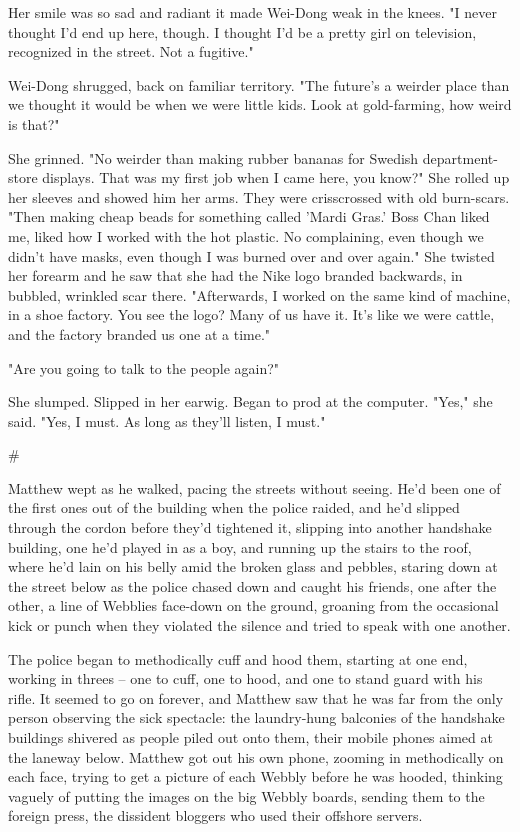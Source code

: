 Her smile was so sad and radiant it made Wei-Dong weak in the
knees. "I never thought I'd end up here, though. I thought I'd be a
pretty girl on television, recognized in the street. Not a
fugitive."

Wei-Dong shrugged, back on familiar territory. "The future's a
weirder place than we thought it would be when we were little kids.
Look at gold-farming, how weird is that?"

She grinned. "No weirder than making rubber bananas for Swedish
department-store displays. That was my first job when I came here,
you know?" She rolled up her sleeves and showed him her arms. They
were crisscrossed with old burn-scars. "Then making cheap beads for
something called 'Mardi Gras.' Boss Chan liked me, liked how I
worked with the hot plastic. No complaining, even though we didn't
have masks, even though I was burned over and over again." She
twisted her forearm and he saw that she had the Nike logo branded
backwards, in bubbled, wrinkled scar there. "Afterwards, I worked
on the same kind of machine, in a shoe factory. You see the logo?
Many of us have it. It's like we were cattle, and the factory
branded us one at a time."

"Are you going to talk to the people again?"

She slumped. Slipped in her earwig. Began to prod at the computer.
"Yes," she said. "Yes, I must. As long as they'll listen, I must."

\#

Matthew wept as he walked, pacing the streets without seeing. He'd
been one of the first ones out of the building when the police
raided, and he'd slipped through the cordon before they'd tightened
it, slipping into another handshake building, one he'd played in as
a boy, and running up the stairs to the roof, where he'd lain on
his belly amid the broken glass and pebbles, staring down at the
street below as the police chased down and caught his friends, one
after the other, a line of Webblies face-down on the ground,
groaning from the occasional kick or punch when they violated the
silence and tried to speak with one another.

The police began to methodically cuff and hood them, starting at
one end, working in threes -- one to cuff, one to hood, and one to
stand guard with his rifle. It seemed to go on forever, and Matthew
saw that he was far from the only person observing the sick
spectacle: the laundry-hung balconies of the handshake buildings
shivered as people piled out onto them, their mobile phones aimed
at the laneway below. Matthew got out his own phone, zooming in
methodically on each face, trying to get a picture of each Webbly
before he was hooded, thinking vaguely of putting the images on the
big Webbly boards, sending them to the foreign press, the dissident
bloggers who used their offshore servers.

